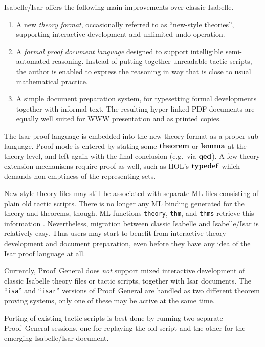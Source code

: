 Isabelle/Isar offers the following main improvements over classic Isabelle.
\begin{enumerate}
\item A new \emph{theory format}, occasionally referred to as ``new-style
  theories'', supporting interactive development and unlimited undo operation.
\item A \emph{formal proof document language} designed to support intelligible
  semi-automated reasoning.  Instead of putting together unreadable tactic
  scripts, the author is enabled to express the reasoning in way that is close
  to usual mathematical practice.
\item A simple document preparation system, for typesetting formal
  developments together with informal text.  The resulting hyper-linked PDF
  documents are equally well suited for WWW presentation and as printed
  copies.
\end{enumerate}

The Isar proof language is embedded into the new theory format as a proper
sub-language.  Proof mode is entered by stating some ${\mathord{\mathbf{theorem}}}$ or
${\mathord{\mathbf{lemma}}}$ at the theory level, and left again with the final conclusion
(e.g.\ via ${\mathord{\mathbf{qed}}}$).  A few theory extension mechanisms require proof as
well, such as HOL's ${\mathord{\mathbf{typedef}}}$ which demands non-emptiness of the
representing sets.

New-style theory files may still be associated with separate ML files
consisting of plain old tactic scripts.  There is no longer any ML binding
generated for the theory and theorems, though.  ML functions \texttt{theory},
\texttt{thm}, and \texttt{thms} retrieve this information \cite{isabelle-ref}.
Nevertheless, migration between classic Isabelle and Isabelle/Isar is
relatively easy.  Thus users may start to benefit from interactive theory
development and document preparation, even before they have any idea of the
Isar proof language at all.

\begin{warn}
  Currently, Proof~General does \emph{not} support mixed interactive
  development of classic Isabelle theory files or tactic scripts, together
  with Isar documents.  The ``\texttt{isa}'' and ``\texttt{isar}'' versions of
  Proof~General are handled as two different theorem proving systems, only one
  of these may be active at the same time.
\end{warn}

Porting of existing tactic scripts is best done by running two separate
Proof~General sessions, one for replaying the old script and the other for the
emerging Isabelle/Isar document.



